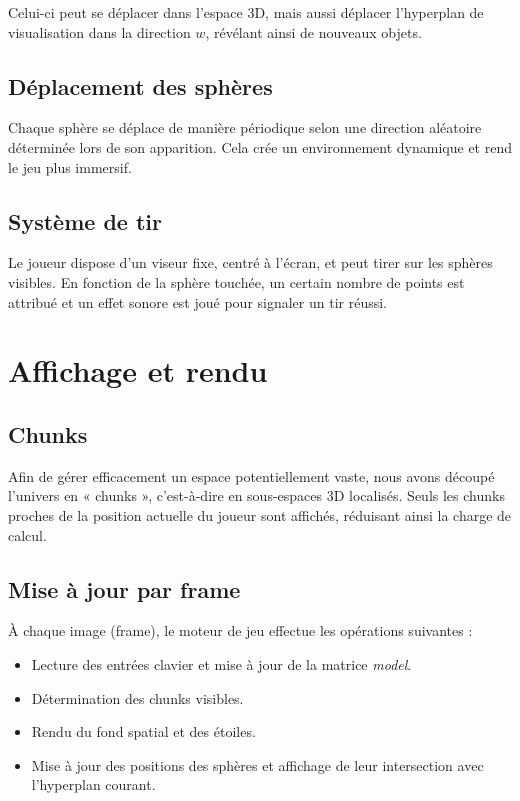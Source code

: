 \documentclass[11pt,a4paper]{article}
\begin{document}
Celui-ci peut se déplacer dans l’espace 3D, mais aussi déplacer l’hyperplan de visualisation dans la direction $w$, révélant ainsi de nouveaux objets.

\subsection{Déplacement des sphères}

Chaque sphère se déplace de manière périodique selon une direction aléatoire déterminée lors de son apparition. Cela crée un environnement dynamique et rend le jeu plus immersif.

\subsection{Système de tir}

Le joueur dispose d’un viseur fixe, centré à l’écran, et peut tirer sur les sphères visibles. En fonction de la sphère touchée, un certain nombre de points est attribué et un effet sonore est joué pour signaler un tir réussi.

\section{Affichage et rendu}

\subsection{Chunks}

Afin de gérer efficacement un espace potentiellement vaste, nous avons découpé l’univers en « chunks », c’est-à-dire en sous-espaces 3D localisés. Seuls les chunks proches de la position actuelle du joueur sont affichés, réduisant ainsi la charge de calcul.

\subsection{Mise à jour par frame}

À chaque image (frame), le moteur de jeu effectue les opérations suivantes :
\begin{itemize}
	\item Lecture des entrées clavier et mise à jour de la matrice \textit{model}.
	\item Détermination des chunks visibles.
	\item Rendu du fond spatial et des étoiles.
	\item Mise à jour des positions des sphères et affichage de leur intersection avec l’hyperplan courant.
\end{itemize}
\end{document}
